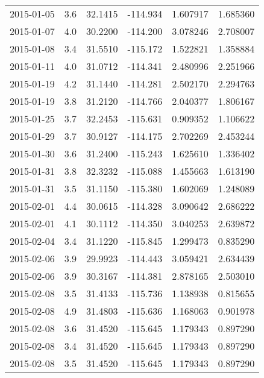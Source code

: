 \begin{tabular}{lrrrrr}
2015-01-05 &       3.6 &  32.1415 &  -114.934 &         1.607917 &         1.685360 \\
2015-01-07 &       4.0 &  30.2200 &  -114.200 &         3.078246 &         2.708007 \\
2015-01-08 &       3.4 &  31.5510 &  -115.172 &         1.522821 &         1.358884 \\
2015-01-11 &       4.0 &  31.0712 &  -114.341 &         2.480996 &         2.251966 \\
2015-01-19 &       4.2 &  31.1440 &  -114.281 &         2.502170 &         2.294763 \\
2015-01-19 &       3.8 &  31.2120 &  -114.766 &         2.040377 &         1.806167 \\
2015-01-25 &       3.7 &  32.2453 &  -115.631 &         0.909352 &         1.106622 \\
2015-01-29 &       3.7 &  30.9127 &  -114.175 &         2.702269 &         2.453244 \\
2015-01-30 &       3.6 &  31.2400 &  -115.243 &         1.625610 &         1.336402 \\
2015-01-31 &       3.8 &  32.3232 &  -115.088 &         1.455663 &         1.613190 \\
2015-01-31 &       3.5 &  31.1150 &  -115.380 &         1.602069 &         1.248089 \\
2015-02-01 &       4.4 &  30.0615 &  -114.328 &         3.090642 &         2.686222 \\
2015-02-01 &       4.1 &  30.1112 &  -114.350 &         3.040253 &         2.639872 \\
2015-02-04 &       3.4 &  31.1220 &  -115.845 &         1.299473 &         0.835290 \\
2015-02-06 &       3.9 &  29.9923 &  -114.443 &         3.059421 &         2.634439 \\
2015-02-06 &       3.9 &  30.3167 &  -114.381 &         2.878165 &         2.503010 \\
2015-02-08 &       3.5 &  31.4133 &  -115.736 &         1.138938 &         0.815655 \\
2015-02-08 &       4.9 &  31.4803 &  -115.636 &         1.168063 &         0.901978 \\
2015-02-08 &       3.6 &  31.4520 &  -115.645 &         1.179343 &         0.897290 \\
2015-02-08 &       3.4 &  31.4520 &  -115.645 &         1.179343 &         0.897290 \\
2015-02-08 &       3.5 &  31.4520 &  -115.645 &         1.179343 &         0.897290 \\

\end{tabular}
